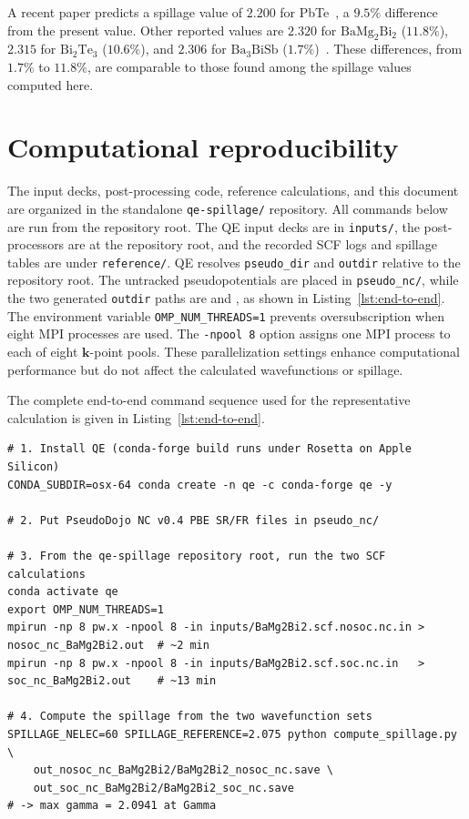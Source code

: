 \documentclass[11pt]{article}
\newcommand{\kk}{\mathbf{k}}
\newcommand{\bmb}{\mathrm{BaMg_2Bi_2}}
\newcommand{\bath}{\mathrm{Ba_3BiSb}}
\begin{document}
A recent paper predicts a spillage value of $2.200$ for PbTe~\cite{li2026}, a $9.5\%$ difference
from the present value. Other reported values are $2.320$ for $\bmb$ ($11.8\%$), $2.315$ for
$\mathrm{Bi_2Te_3}$ ($10.6\%$), and $2.306$ for $\bath$ ($1.7\%$)~\cite{li2026}. These differences,
from $1.7\%$ to $11.8\%$, are comparable to those found among the spillage values computed here.

\section{Computational reproducibility}

The input decks, post-processing code, reference calculations, and this document are organized in
the standalone \texttt{qe-spillage/} repository. All commands below are run from the repository
root. The QE input decks are in \texttt{inputs/}, the post-processors are at the repository root,
and the recorded SCF logs and spillage tables are under \texttt{reference/}. QE resolves
\texttt{pseudo\_dir} and \texttt{outdir} relative to the repository root. The untracked
pseudopotentials are placed in \texttt{pseudo\_nc/}, while the two generated \texttt{outdir} paths
are  and , as shown in
Listing~\ref{lst:end-to-end}. The environment
variable \texttt{OMP\_NUM\_THREADS=1} prevents oversubscription when eight MPI processes are used.
The \texttt{-npool 8} option assigns one MPI process to each of eight $\kk$-point pools. These
parallelization settings enhance computational performance but do not affect the calculated
wavefunctions or spillage.

The complete end-to-end command sequence used for the representative calculation is given in
Listing~\ref{lst:end-to-end}.

\begin{lstlisting}[caption={End-to-end commands for the worked example of BaMg2Bi2.},label={lst:end-to-end}]
# 1. Install QE (conda-forge build runs under Rosetta on Apple Silicon)
CONDA_SUBDIR=osx-64 conda create -n qe -c conda-forge qe -y

# 2. Put PseudoDojo NC v0.4 PBE SR/FR files in pseudo_nc/

# 3. From the qe-spillage repository root, run the two SCF calculations
conda activate qe
export OMP_NUM_THREADS=1
mpirun -np 8 pw.x -npool 8 -in inputs/BaMg2Bi2.scf.nosoc.nc.in > nosoc_nc_BaMg2Bi2.out  # ~2 min
mpirun -np 8 pw.x -npool 8 -in inputs/BaMg2Bi2.scf.soc.nc.in   > soc_nc_BaMg2Bi2.out    # ~13 min

# 4. Compute the spillage from the two wavefunction sets
SPILLAGE_NELEC=60 SPILLAGE_REFERENCE=2.075 python compute_spillage.py \
    out_nosoc_nc_BaMg2Bi2/BaMg2Bi2_nosoc_nc.save \
    out_soc_nc_BaMg2Bi2/BaMg2Bi2_soc_nc.save
# -> max gamma = 2.0941 at Gamma
\end{lstlisting}
\end{document}
